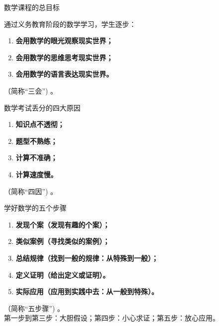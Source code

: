 \documentclass[aspectratio=169]{ctexbeamer} %
\date{\today}
\begin{document}
\begin{frame}[t]{数学课程的总目标}
\begin{spacing}{1.2} %
{\large
通过义务教育阶段的数学学习，学生逐步：\\
\begin{enumerate}[label={\arabic*.}]
\item \textbf{会用数学的眼光观察现实世界；}\\
\item \textbf{会用数学的思维思考现实世界；}\\
\item \textbf{会用数学的语言表达现实世界。}\\
\end{enumerate}
（简称“三会”) 。\\
}
\end{spacing}
\end{frame}

\begin{frame}[t]{数学考试丢分的四大原因}
\begin{spacing}{1} %
{\large
\begin{enumerate}[label={\arabic*.}]
\item \textbf{知识点不透彻；}\\
\item \textbf{题型不熟练；}\\
\item \textbf{计算不准确；}\\
\item \textbf{计算速度慢。} \\
\end{enumerate}
（简称“四因”) 。\\
}
\end{spacing}
\end{frame}

\begin{frame}[t]{学好数学的五个步骤}
\begin{spacing}{1} %
{\large
\begin{enumerate}[label={\arabic*.}]
\item \textbf{发现个案（发现有趣的个案）；}\\
\item \textbf{类似案例（寻找类似的案例）；}\\
\item \textbf{总结规律（找到一般的规律：从特殊到一般）；}\\
\item \textbf{定义证明（给出定义或证明）。} \\
\item \textbf{实际应用（应用到实践中去：从一般到特殊）。} \\
\end{enumerate}
（简称“五步骤”) 。\\
\alert{第一步到第三步：大胆假设；第四步：小心求证；第五步：放心应用。}\\
}
\end{spacing}
\end{frame}
\end{document}
